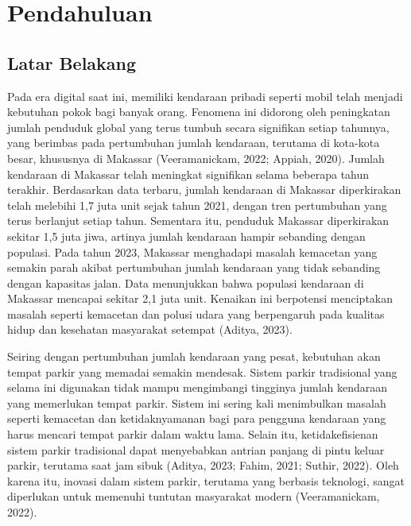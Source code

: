 \chapter{Pendahuluan}
\section{Latar Belakang}
    Pada era digital saat ini, memiliki kendaraan pribadi seperti mobil telah menjadi
    kebutuhan pokok bagi banyak orang. Fenomena ini didorong oleh peningkatan jumlah
    penduduk global yang terus tumbuh secara signifikan setiap tahunnya, yang berimbas
    pada pertumbuhan jumlah kendaraan, terutama di kota-kota besar, khususnya di
    Makassar (Veeramanickam, 2022; Appiah, 2020). Jumlah kendaraan di Makassar telah
    meningkat signifikan selama beberapa tahun terakhir. Berdasarkan data terbaru, jumlah
    kendaraan di Makassar diperkirakan telah melebihi 1,7 juta unit sejak tahun 2021,
    dengan tren pertumbuhan yang terus berlanjut setiap tahun. Sementara itu, penduduk
    Makassar diperkirakan sekitar 1,5 juta jiwa, artinya jumlah kendaraan hampir
    sebanding dengan populasi. Pada tahun 2023, Makassar menghadapi masalah
    kemacetan yang semakin parah akibat pertumbuhan jumlah kendaraan yang tidak
    sebanding dengan kapasitas jalan. Data menunjukkan bahwa populasi kendaraan di
    Makassar mencapai sekitar 2,1 juta unit. Kenaikan ini berpotensi menciptakan masalah
    seperti kemacetan dan polusi udara yang berpengaruh pada kualitas hidup dan
    kesehatan masyarakat setempat (Aditya, 2023). \par

    Seiring dengan pertumbuhan jumlah kendaraan yang pesat, kebutuhan akan
    tempat parkir yang memadai semakin mendesak. Sistem parkir tradisional yang selama
    ini digunakan tidak mampu mengimbangi tingginya jumlah kendaraan yang
    memerlukan tempat parkir. Sistem ini sering kali menimbulkan masalah seperti
    kemacetan dan ketidaknyamanan bagi para pengguna kendaraan yang harus mencari
    tempat parkir dalam waktu lama. Selain itu, ketidakefisienan sistem parkir tradisional
    dapat menyebabkan antrian panjang di pintu keluar parkir, terutama saat jam sibuk
    (Aditya, 2023; Fahim, 2021; Suthir, 2022). Oleh karena itu, inovasi dalam sistem parkir,
    terutama yang berbasis teknologi, sangat diperlukan untuk memenuhi tuntutan
    masyarakat modern (Veeramanickam, 2022).\par
